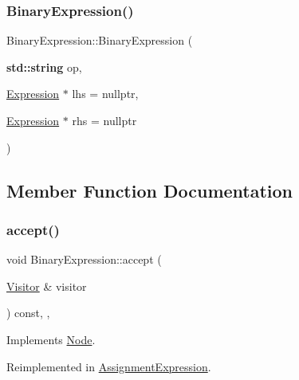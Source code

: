 \subsubsection{\texorpdfstring{Binary\+Expression()}{BinaryExpression()}}
{\footnotesize\ttfamily Binary\+Expression\+::\+Binary\+Expression (\begin{DoxyParamCaption}\item[{\textbf{ std\+::string}}]{op,  }\item[{\hyperlink{struct_expression}{Expression} $\ast$}]{lhs = {\ttfamily nullptr},  }\item[{\hyperlink{struct_expression}{Expression} $\ast$}]{rhs = {\ttfamily nullptr} }\end{DoxyParamCaption})\hspace{0.3cm}{\ttfamily [inline]}}



\subsection{Member Function Documentation}
\mbox{\label{struct_binary_expression_af8318bd8b21b4bbca064e8a6086a10a0}} 
\subsubsection{\texorpdfstring{accept()}{accept()}}
{\footnotesize\ttfamily void Binary\+Expression\+::accept (\begin{DoxyParamCaption}\item[{\hyperlink{struct_visitor}{Visitor} \&}]{visitor }\end{DoxyParamCaption}) const\hspace{0.3cm}{\ttfamily [inline]}, {\ttfamily [override]}, {\ttfamily [virtual]}}



Implements \hyperlink{struct_node_a10bd7af968140bbf5fa461298a969c71}{Node}.



Reimplemented in \hyperlink{struct_assignment_expression_ac3d1a00abf176502782937938f629a9f}{Assignment\+Expression}.

\mbox{\label{struct_binary_expression_a9ab583e823bac39ed8fd8eb34747ac9f}} 
